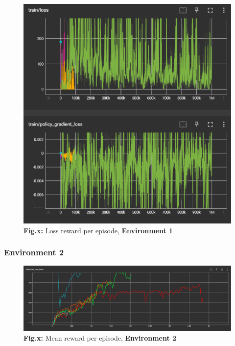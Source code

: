 \documentclass{article}
\numberwithin{equation}{section}
\numberwithin{equation}{section}
\begin{document}
\begin{figure}[H]
	\centering
\includegraphics[width=\linewidth]{loss_env1.png}
	\\	
	\vspace{0.1in}
	\textbf{Fig.x:} Loss reward per episode, \textbf{Environment 1}
	\\
	\label{fig:Fig.3}
\end{figure}




\subsubsection*{Environment 2}


\begin{figure}[H]
	\centering
\includegraphics[scale=3,width=\linewidth]{ep_rew_mean_env2.png}
	\\	
	\vspace{0.1in}
	\textbf{Fig.x:} Mean reward per episode, \textbf{Environment 2}
	\\
	\label{fig:Fig.3}
\end{figure}
\end{document}
